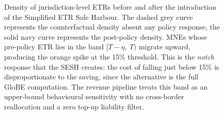 \documentclass[11pt,a4paper]{article}
\begin{document}
\begin{figure}[H]
\caption[Bunching at the 15\% threshold under the Simplified ETR Safe Harbour.]{Density of jurisdiction-level ETRs before and after the introduction of the Simplified ETR Safe Harbour. The dashed grey curve represents the counterfactual density absent any policy response, the solid navy curve represents the post-policy density. MNEs whose pre-policy ETR lies in the band $[T-\eta,\ T)$ migrate upward, producing the orange spike at the 15\% threshold. This is the \emph{notch} response that the SESH creates: the cost of falling just below 15\% is disproportionate to the saving, since the alternative is the full GloBE computation. The revenue pipeline treats this band as an upper-bound behavioural sensitivity with no cross-border reallocation and a zero top-up liability filter.}
\label{fig:sesh_bunching}
\end{figure}
\end{document}
